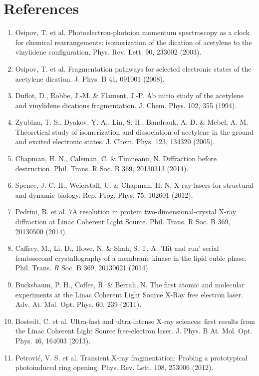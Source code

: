 \documentclass[10pt]{article}
\def\AA{\mathring{\mathrm{A}}}
\begin{document}
\section*{References}
\begin{enumerate}
  \item Osipov, T. et al. Photoelectron-photoion momentum spectroscopy as a clock for chemical rearrangements: isomerization of the dication of acetylene to the vinylidene configuration. Phys. Rev. Lett. 90, 233002 (2003).
  \item Osipov, T. et al. Fragmentation pathways for selected electronic states of the acetylene dication. J. Phys. B 41, 091001 (2008).
  \item Duflot, D., Robbe, J.-M. \& Flament, J.-P. Ab initio study of the acetylene and vinylidene dications fragmentation. J. Chem. Phys. 102, 355 (1994).
  \item Zyubina, T. S., Dyakov, Y. A., Lin, S. H., Bandrauk, A. D. \& Mebel, A. M. Theoretical study of isomerization and dissociation of acetylene in the ground and excited electronic states. J. Chem. Phys. 123, 134320 (2005).
  \item Chapman, H. N., Caleman, C. \& Timneanu, N. Diffraction before destruction. Phil. Trans. R Soc. B 369, 20130313 (2014).
  \item Spence, J. C. H., Weierstall, U. \& Chapman, H. N. X-ray lasers for structural and dynamic biology. Rep. Prog. Phys. 75, 102601 (2012).
  \item Pedrini, B. et al. $7 \AA$ resolution in protein two-dimensional-crystal X-ray diffraction at Linac Coherent Light Source. Phil. Trans. R Soc. B 369, 20130500 (2014).
  \item Caffrey, M., Li, D., Howe, N. \& Shah, S. T. A. 'Hit and run' serial femtosecond crystallography of a membrane kinase in the lipid cubic phase. Phil. Trans. $R$ Soc. B 369, 20130621 (2014).
  \item Bucksbaum, P. H., Coffee, R. \& Berrah, N. The first atomic and molecular experiments at the Linac Coherent Light Source X-Ray free electron laser. Adv. At. Mol. Opt. Phys. 60, 239 (2011).
  \item Bostedt, C. et al. Ultra-fast and ultra-intense X-ray sciences: first results from the Linac Coherent Light Source free-electron laser. J. Phys. B At. Mol. Opt. Phys. 46, 164003 (2013).
  \item Petrović, V. S. et al. Transient X-ray fragmentation: Probing a prototypical photoinduced ring opening. Phys. Rev. Lett. 108, 253006 (2012).

\end{enumerate}
\end{document}
